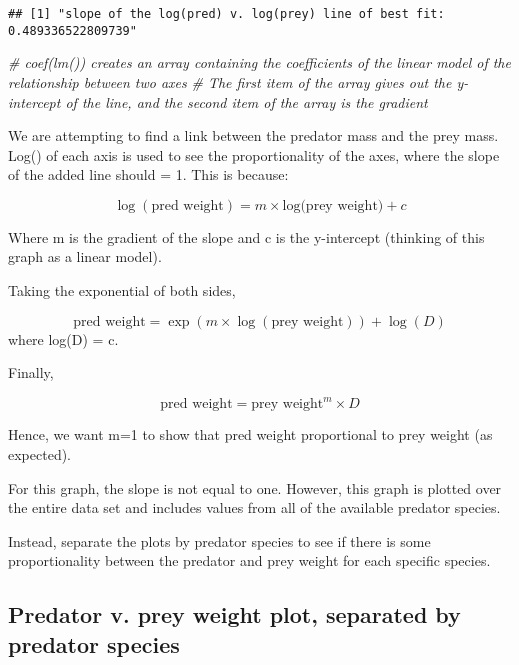\documentclass[
]{article}
\newenvironment{Shaded}{\begin{snugshade}}{\end{snugshade}}
\newcommand{\CommentTok}[1]{\textcolor[rgb]{0.56,0.35,0.01}{\textit{#1}}}
\begin{document}
\begin{verbatim}
## [1] "slope of the log(pred) v. log(prey) line of best fit: 0.489336522809739"
\end{verbatim}

\begin{Shaded}
\begin{Highlighting}[]
\CommentTok{\# coef(lm()) creates an array containing the coefficients of the linear model of the relationship between two axes}
\CommentTok{\# The first item of the array gives out the y{-}intercept of the line, and the second item of the array is the gradient}
\end{Highlighting}
\end{Shaded}

We are attempting to find a link between the predator mass and the prey
mass. Log() of each axis is used to see the proportionality of the axes,
where the slope of the added line should = 1. This is because:

\[
 \log (\text{pred weight}) = m \times \text{log(prey weight)} + c
\]

Where m is the gradient of the slope and c is the y-intercept (thinking
of this graph as a linear model).

Taking the exponential of both sides,

\[
  \text{pred weight} = \exp({{m}\times{\log(\text{prey weight})}}) + \log(D)
\] where log(D) = c.~

Finally,

\[
  \text{pred weight} = \text{prey weight}^m \times D
\]

Hence, we want m=1 to show that pred weight proportional to prey weight
(as expected).

For this graph, the slope is not equal to one. However, this graph is
plotted over the entire data set and includes values from all of the
available predator species.

Instead, separate the plots by predator species to see if there is some
proportionality between the predator and prey weight for each specific
species.

\hypertarget{predator-v.-prey-weight-plot-separated-by-predator-species}{%
\subsection{Predator v. prey weight plot, separated by predator
species}\label{predator-v.-prey-weight-plot-separated-by-predator-species}}
\end{document}
